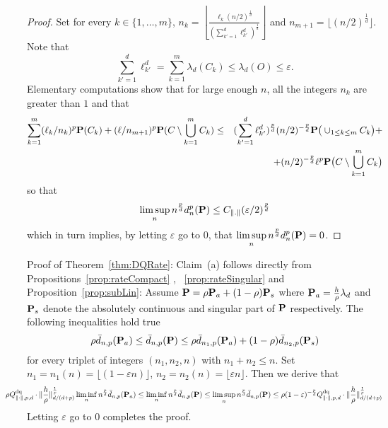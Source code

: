 \begin{proof}
Set for every $k \!\in \{1,\ldots,m\}$, $\displaystyle n_k =\left \lfloor \frac{\ell_k(n/2)^{\frac 1d}}{(\sum_{k'=1}^d\ell_{k'}^d)^{\frac 1d}}\right \rfloor$ 
and $\displaystyle n_{m+1} = \lfloor (n/2)^{\frac 1d} \rfloor$. Note that 
\[
\sum_{k'=1}^d\ell_{k'}^d= \sum_{k=1}^m \lambda_d(C_k) \le \lambda_d(O)\le \varepsilon.
\]
Elementary computations show that for large enough $n$,  all the integers $n_k$ are greater
than $1$ and that 
\begin{eqnarray*} 
\sum_{k=1}^m (\ell_k/n_k)^p\mathbf{P}(C_k) + (\ell/n_{m+1})^p\mathbf{P}(C \setminus  \bigcup_{k=1}^mC_k ) & \le & (\sum_{k'=1}^d\ell_{k'}^d)^{\frac pd}(n/2)^{-\frac pd} \mathbf{P}\big(\cup_{1\le k\le m} C_k\big) + \\
&& +(n/2)^{-\frac pd} \ell^p \mathbf{P}\big(C \setminus  \bigcup_{k=1}^mC_k \big)\\ 
\end{eqnarray*}
so that \[ \limsup_n n^{\frac pd} d_{n}^p(\mathbf{P}) \le C_{\lVert.\rVert} (\varepsilon/2)^{\frac pd}\]
which in turn
implies, by letting $\varepsilon $ go to $0$, that $\displaystyle \limsup_n n^{\frac pd}
d_{n}^p(\mathbf{P})=0$. 
\end{proof}


 {\sc Proof of Theorem~\ref{thm:DQRate}:}
 Claim~(a) follows directly from Propositions~\ref{prop:rateCompact} , 
~\ref{prop:rateSingular} and  Proposition~\ref{prop:subLin}: Assume $\mathbf{P} = \rho \mathbf{P}_a +(1-\rho)\mathbf{P}_s$ where $\mathbf{P}_a= \frac {h}{\rho}\lambda_d$ and $\mathbf{P}_s$ denote the absolutely continuous and singular part of $\mathbf{P}$ respectively. The following inequalities hold true 
\[
 \rho \bar d_{n,p} (\mathbf{P}_a)\le \bar d_{n,p}(\mathbf{P})\le \rho \bar d_{n_1,p}(\mathbf{P}_a)+(1-\rho) \bar d_{n_2,p}(\mathbf{P}_s)
 \]
 for every triplet of integers $(n_1,n_2,n)$ with $n_1+n_2\le n$. Set $n_1= n_1(n)= \lfloor (1- \varepsilon n) \rfloor$, $n_2= n_2(n)= \lfloor  \varepsilon n \rfloor$. Then we derive that 
 \[
\hskip -1cm\rho  \Qpn\cdot \normdp{\frac{h}{\rho} }^{\frac 1p} \liminf_n n^{\frac p d}\bar d_{n,p} (\Probb_a)\le  \liminf_n n^{\frac p d}\bar d_{n,p} (\Probb)\le  \limsup_n n^{\frac p d}\bar d_{n,p} (\Probb)\le \rho (1-\varepsilon)^{-\frac p d}  \Qpn\cdot \normdp{\frac{h}{\rho}}^{\frac 1p}
 \]
 Letting $\varepsilon $ go to $0$ completes the proof.
 
